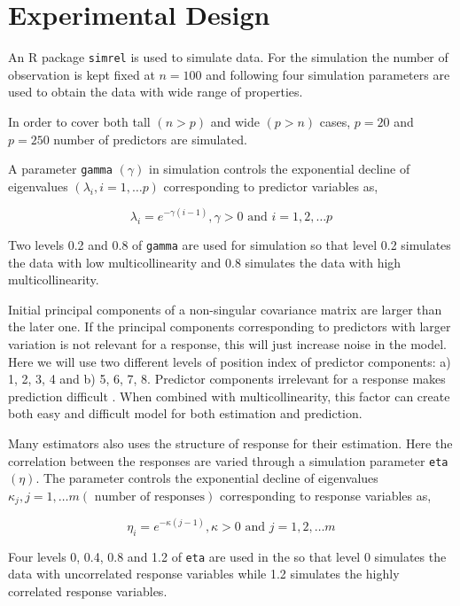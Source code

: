 \documentclass[12pt,3p,authoryear]{elsarticle}
\providecommand{\tightlist}{%
  \setlength{\itemsep}{0pt}\setlength{\parskip}{0pt}}
\begin{document}
\hypertarget{experimental-design}{\section{Experimental
Design}\label{experimental-design}}

An R \citep{coreR2018} package \texttt{simrel}
\citep{Rimal2018, saebo2015simrel} is used to simulate data. For the
simulation the number of observation is kept fixed at \(n = 100\) and
following four simulation parameters are used to obtain the data with
wide range of properties.

\begin{description}
\tightlist
\item[\textbf{Number of predictors:}]
In order to cover both tall \((n>p)\) and wide \((p>n)\) cases, \(p=20\)
and \(p=250\) number of predictors are simulated.
\item[\textbf{Multicollinearity in predictor variables:}]
A parameter \texttt{gamma} \((\gamma)\) in simulation controls the
exponential decline of eigenvalues \((\lambda_i, i = 1, \ldots p)\)
corresponding to predictor variables as,

\begin{equation}
  \lambda_i = e^{-\gamma(i-1)}, \gamma > 0 \text{ and } i = 1, 2, \ldots p
  \label{eq:gamma}
  \end{equation}

Two levels 0.2 and 0.8 of \texttt{gamma} are used for simulation so that
level 0.2 simulates the data with low multicollinearity and 0.8
simulates the data with high multicollinearity.
\item[\textbf{Position of relevant components:}]
Initial principal components of a non-singular covariance matrix are
larger than the later one. If the principal components corresponding to
predictors with larger variation is not relevant for a response, this
will just increase noise in the model. Here we will use two different
levels of position index of predictor components: a) 1, 2, 3, 4 and b)
5, 6, 7, 8. Predictor components irrelevant for a response makes
prediction difficult \citep{Helland1994b}. When combined with
multicollinearity, this factor can create both easy and difficult model
for both estimation and prediction.
\item[\textbf{Correlation in response variables:}]
Many estimators also uses the structure of response for their
estimation. Here the correlation between the responses are varied
through a simulation parameter \texttt{eta} \((\eta)\). The parameter
controls the exponential decline of eigenvalues
\(\kappa_j, j = 1, \ldots m (\text{ number of responses})\)
corresponding to response variables as,

\begin{equation}
\eta_i = e^{-\kappa(j-1)}, \kappa > 0 \text{ and } j = 1, 2, \ldots m
\label{eq:eta}
\end{equation}

Four levels 0, 0.4, 0.8 and 1.2 of \texttt{eta} are used in the so that
level 0 simulates the data with uncorrelated response variables while
1.2 simulates the highly correlated response variables.
\end{description}
\end{document}
